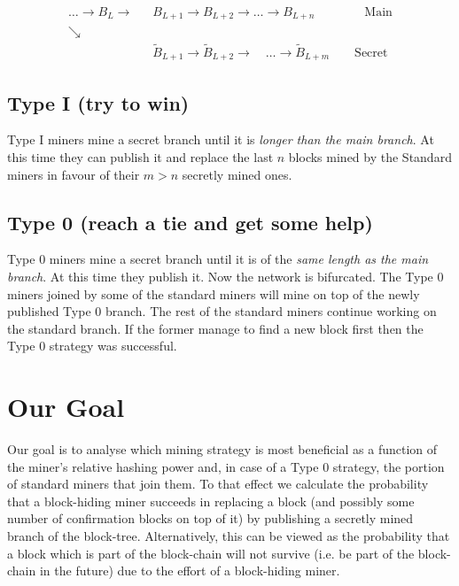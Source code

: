 \documentclass[letterpaper,12pt]{report}
\theoremstyle{plain}
\theoremstyle{definition}
\begin{document}
\begin{eqnarray}\label{fig:blockhidingchain}
 \dots \rightarrow \mathit{B}_L\rightarrow &\mathit{B}_{L+1}\rightarrow\mathit{B}_{L+2}
\rightarrow\dots\rightarrow\mathit{B}_{L+n} \qquad\qquad \mathrm{Main}\\\nonumber
\searrow & \\\nonumber
\qquad \qquad \qquad & \widetilde{\mathit{B}}_{L+1}\rightarrow\widetilde{\mathit{B}}_{L+2}
\longrightarrow \quad \dots \longrightarrow\widetilde{\mathit{B}}_{L+m}\qquad \mathrm{Secret}
\end{eqnarray}

\subsection{Type I (try to win)}
Type I miners mine a secret branch until it is \textit{longer than the main branch}. At this time they can publish it and replace the last $n$ blocks mined by the Standard miners in favour of their $m>n$ secretly mined ones.

\subsection{Type 0 (reach a tie and get some help)}
Type 0 miners mine a secret branch until it is of the  \textit{same length as the main branch}. At this time they publish it. Now the network is bifurcated. The Type 0 miners joined by some of the standard miners will mine on top of the newly published Type 0 branch. The rest of the standard miners continue working on the standard branch. If the former manage to find a new block first then the Type 0 strategy was successful. 

\section{Our Goal}\label{subsec:goal}

Our goal is to analyse which mining strategy is most beneficial as a function of the miner's relative hashing power and, in case of a Type 0 strategy, the portion of standard miners that join them.
To that effect we calculate the probability that a block-hiding miner succeeds in replacing a block (and possibly some number of confirmation blocks on top of it) by publishing a secretly mined branch of the block-tree. Alternatively, this can be viewed as the probability that a block which is part of the block-chain will not survive (i.e. be part of the block-chain in the future) due to the effort of a block-hiding miner.
\end{document}
